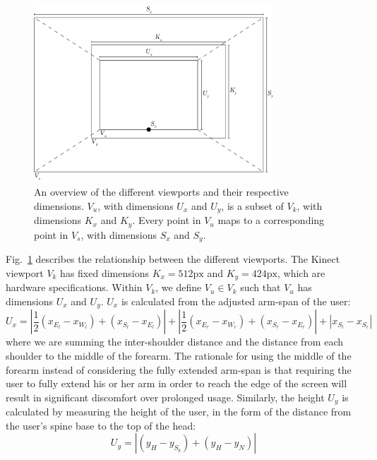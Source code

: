 \documentclass{scrartcl}
\numberwithin{equation}{section}
\begin{document}
      \begin{figure}[ht!]
        \centering
        \includegraphics[width=0.8\textwidth]{img/Mapping}
        \caption{An overview of the different viewports and their respective dimensions. $V_u$, with dimensions $U_x$ and $U_y$, is a subset of $V_k$, with dimensions $K_x$ and $K_y$. Every point in $V_u$ maps to a corresponding point in $V_s$, with dimensions $S_x$ and $S_y$.\label{fig:mapping}}
      \end{figure}
      Fig.~\ref{fig:mapping} describes the relationship between the different viewports. The Kinect viewport $V_k$ has fixed dimensions $K_x = 512\textrm{px}$ and $K_y = 424\textrm{px}$, which are hardware specifications. Within $V_k$, we define $V_u \in V_k$ such that $V_u$ has dimensions $U_x$ and $U_y$. $U_x$ is calculated from the adjusted arm-span of the user:
      \begin{equation}
        U_x = \left|\frac{1}{2}(x_{E_l}-x_{W_l}) + (x_{S_l} - x_{E_l})\right| + \left|\frac{1}{2}(x_{E_r}-x_{W_r}) + (x_{S_r} - x_{E_r})\right| + \left| x_{S_l} - x_{S_r} \right|
      \end{equation}
      where we are summing the inter-shoulder distance and the distance from each shoulder to the middle of the forearm. The rationale for using the middle of the forearm instead of considering the fully extended arm-span is that requiring the user to fully extend his or her arm in order to reach the edge of the screen will result in significant discomfort over prolonged usage. Similarly, the height $U_y$ is calculated by measuring the height of the user, in the form of the distance from the user's spine base to the top of the head:
      \begin{equation}
        U_y = \left|(y_H - y_{S_b}) + (y_H - y_N)\right|
      \end{equation}
\end{document}
